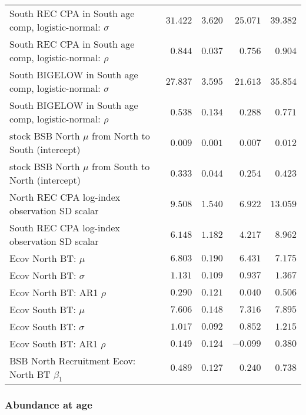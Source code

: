 \documentclass[
]{article}
\begin{document}
\begin{landscape}
\begin{longtable}[t]{lrrrr}
\addlinespace
South REC CPA in South age comp, logistic-normal: $\sigma$ & $31.422$ & $3.620$ & $25.071$ & $39.382$\\
South REC CPA in South age comp, logistic-normal: $\rho$ & $0.844$ & $0.037$ & $0.756$ & $0.904$\\
South BIGELOW in South age comp, logistic-normal: $\sigma$ & $27.837$ & $3.595$ & $21.613$ & $35.854$\\
South BIGELOW in South age comp, logistic-normal: $\rho$ & $0.538$ & $0.134$ & $0.288$ & $0.771$\\
stock BSB North $\mu$ from North to South (intercept) & $0.009$ & $0.001$ & $0.007$ & $0.012$\\
\addlinespace
stock BSB North $\mu$ from South to North (intercept) & $0.333$ & $0.044$ & $0.254$ & $0.423$\\
North REC CPA log-index observation SD scalar & $9.508$ & $1.540$ & $6.922$ & $13.059$\\
South REC CPA log-index observation SD scalar & $6.148$ & $1.182$ & $4.217$ & $8.962$\\
Ecov North BT: $\mu$ & $6.803$ & $0.190$ & $6.431$ & $7.175$\\
Ecov North BT: $\sigma$ & $1.131$ & $0.109$ & $0.937$ & $1.367$\\
\addlinespace
Ecov North BT: AR1 $\rho$ & $0.290$ & $0.121$ & $0.040$ & $0.506$\\
Ecov South BT: $\mu$ & $7.606$ & $0.148$ & $7.316$ & $7.895$\\
Ecov South BT: $\sigma$ & $1.017$ & $0.092$ & $0.852$ & $1.215$\\
Ecov South BT: AR1 $\rho$ & $0.149$ & $0.124$ & $-0.099$ & $0.380$\\
BSB North Recruitment Ecov: North BT $\beta_1$ & $0.489$ & $0.127$ & $0.240$ & $0.738$\\*
\end{longtable}
\end{landscape}

\hypertarget{abundance-at-age}{%
\subsubsection{Abundance at age}\label{abundance-at-age}}
\end{document}
